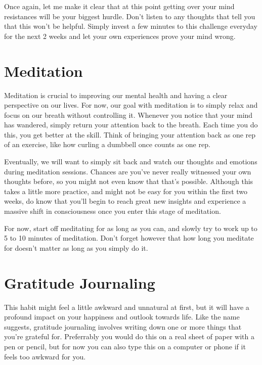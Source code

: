 \documentclass[
]{book}
\begin{document}
Once again, let me make it clear that at this point getting over your mind resistances will be your biggest hurdle. Don't listen to any thoughts that tell you that this won't be helpful. Simply invest a few minutes to this challenge everyday for the next 2 weeks and let your own experiences prove your mind wrong.

\hypertarget{meditation}{%
\section{Meditation}\label{meditation}}

Meditation is crucial to improving our mental health and having a clear perspective on our lives. For now, our goal with meditation is to simply relax and focus on our breath without controlling it. Whenever you notice that your mind has wandered, simply return your attention back to the breath. Each time you do this, you get better at the skill. Think of bringing your attention back as one rep of an exercise, like how curling a dumbbell once counts as one rep.

Eventually, we will want to simply sit back and watch our thoughts and emotions during meditation sessions. Chances are you've never really witnessed your own thoughts before, so you might not even know that that's possible. Although this takes a little more practice, and might not be easy for you within the first two weeks, do know that you'll begin to reach great new insights and experience a massive shift in consciousness once you enter this stage of meditation.

For now, start off meditating for as long as you can, and slowly try to work up to 5 to 10 minutes of meditation. Don't forget however that how long you meditate for doesn't matter as long as you simply do it.

\hypertarget{gratitude-journaling}{%
\section{Gratitude Journaling}\label{gratitude-journaling}}

This habit might feel a little awkward and unnatural at first, but it will have a profound impact on your happiness and outlook towards life. Like the name suggests, gratitude journaling involves writing down one or more things that you're grateful for. Preferrably you would do this on a real sheet of paper with a pen or pencil, but for now you can also type this on a computer or phone if it feels too awkward for you.
\end{document}
